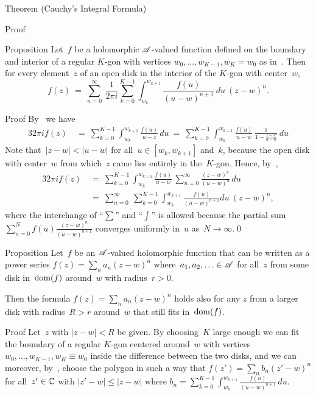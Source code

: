 \documentclass[a]{subfiles}
\begin{document}
\begin{parsec}
\begin{point}{Theorem (Cauchy's Integral Formula)}
\begin{point}{Proof}
\begin{point}
\end{point}
\end{point}
\end{point}
\begin{point}[taylor]{Proposition}%
Let~$f$ be a holomorphic $\mathscr{A}$-valued function
defined on the boundary and interior
of a regular $K$-gon
with vertices $w_0,\dotsc,w_{K-1},w_K=w_0$
as in~.
Then for every element~$z$ of an open disk in the interior of the $K$-gon
with center~$w$,
\begin{equation*}
f(z)\ = \ 
\sum_{n=0}^\infty \ \frac{1}{2\pi i}\sum_{k=0}^{K-1}\int_{w_k}^{w_{k+1}} 
\frac{f(u)}{(u-w)^{n+1}}\,du
\ (z-w)^n.
\end{equation*} 
\begin{point}{Proof}%
By~ we have
\begin{alignat*}{3}
2\pi if(z)\ &=\  
	\sum_{k=0}^{K-1}\int_{w_k}^{w_{k+1}}
	\frac{f(u)}{u-z}\,du
\ =\ 
\sum_{k=0}^{K-1}\int_{w_k}^{w_{k+1}}
   \frac{f(u)}{u-w}\,\frac{1}{1-\frac{z-w}{u-w}}\,du
\end{alignat*}
Note that~$\left|z-w\right|<\left|u-w\right|$
for all~$u\in [w_k,w_{k+1}]$ and~$k$,
because the open disk with center~$w$
from which~$z$ came lies entirely in the~$K$-gon.
Hence,
by~\sref{geometric},
\begin{alignat*}{3}
	2\pi if(z) \ &= \ 
\sum_{k=0}^{K-1}\int_{w_k}^{w_{k+1}}
   \frac{f(u)}{u-w}\, \sum_{n=0}^\infty 
\frac{(z-w)^n}{(u-w)^n}
 \,du\\
 \ &= \ 
  \sum_{n=0}^\infty \ 
\sum_{k=0}^{K-1}\int_{w_k}^{w_{k+1}}
  \frac{f(u)}{(u-w)^{n+1}}du \ (z-w)^n,
\end{alignat*}
where the interchange of ``$\sum$'' and ``$\int$''
is allowed
because the partial sum 
$\sum_{n=0}^Nf(u)\frac{(z-w)^n}{(u-w)^{n+1}}$
converges uniformly in~$u$ as~$N\to\infty$.\qed
\end{point}
\end{point}
\begin{point}{Proposition}%
Let~$f$ be an $\mathscr{A}$-valued holomorphic
function
that 
can be written as a power
series $f(z)=\sum_n a_n (z-w)^n$
where~$a_1,a_2,\dotsc\in\mathscr{A}$
for all~$z$ from some disk in~$\operatorname{dom}(f)$ around~$w$
with radius~$r>0$.

Then the formula $f(z)=\sum_n a_n (z-w)^n$
holds also for any $z$ from a larger disk 
with radius~$R>r$
around~$w$ that still fits in~$\operatorname{dom}(f)$.
\begin{point}{Proof}%
Let~$z$ with $\left|z-w\right|<R$ be given.
By choosing~$K$ large enough
we can fit the boundary of a regular $K$-gon
centered around~$w$
with vertices $w_0,\dotsc,w_{K-1},w_{K}\equiv w_0$
inside the difference between the two disks,
and we can moreover, by~\sref{taylor},
choose the polygon
in such a way that
$f(z')=\sum_n b_n (z'-w)^n$
for all~$z'\in\mathbb{C}$
with $\left|z'-w\right|\leq \left|z-w\right|$
where $b_n = \sum_{k=0}^{K-1}
\int_{w_k}^{w_{k+1}}
\frac{f(u)}{(u-w)^{n+1}}\,du$.


\end{point}
\end{point}
\end{parsec}
\end{document}
